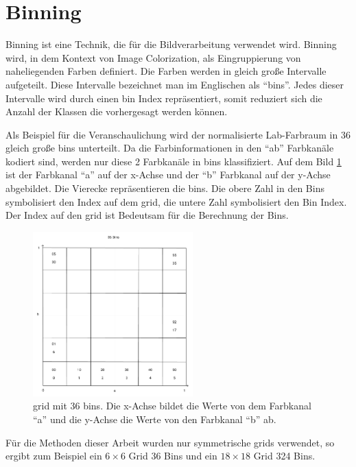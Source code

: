\section{Binning}
Binning ist eine Technik, die für die Bildverarbeitung verwendet wird. Binning wird, in dem Kontext von Image Colorization, als Eingruppierung 
von naheliegenden Farben definiert. Die Farben werden in gleich große Intervalle aufgeteilt. Diese Intervalle bezeichnet man im Englischen als
``\gls{bin}s''. Jedes dieser Intervalle wird durch einen \gls{bin} Index repräsentiert, somit reduziert sich die Anzahl der Klassen die vorhergesagt werden
können.

Als Beispiel für die Veranschaulichung wird der normalisierte Lab-Farbraum in 36 gleich große \gls{bin}s unterteilt. Da die Farbinformationen 
in den ``ab'' Farbkanäle kodiert sind, werden nur diese 2 Farbkanäle in \gls{bin}s klassifiziert. Auf dem Bild \ref{image:bins} ist der Farbkanal 
``a'' auf der x-Achse und der ``b'' Farbkanal auf der y-Achse abgebildet. Die Vierecke repräsentieren die \gls{bin}s. Die obere Zahl in den Bins 
symbolisiert den Index auf dem \gls{grid}, die untere Zahl symbolisiert den Bin Index. Der Index auf den \gls{grid} ist Bedeutsam für die Berechnung der Bins.

\begin{figure}[H]
  \centering
  \includegraphics[width=0.55\textwidth]{resources/bins/bins.jpg}
  \caption{
  \gls{grid} mit 36 bins. Die x-Achse bildet die Werte von dem Farbkanal ``a'' und die y-Achse die Werte von den Farbkanal ``b'' ab.
  }
  \label{image:bins}
\end{figure}

Für die Methoden dieser Arbeit wurden nur symmetrische \gls{grid}s verwendet, so ergibt zum Beispiel ein $6 \times 6$ Grid 36 Bins und 
ein $18 \times 18$ Grid 324 Bins.

